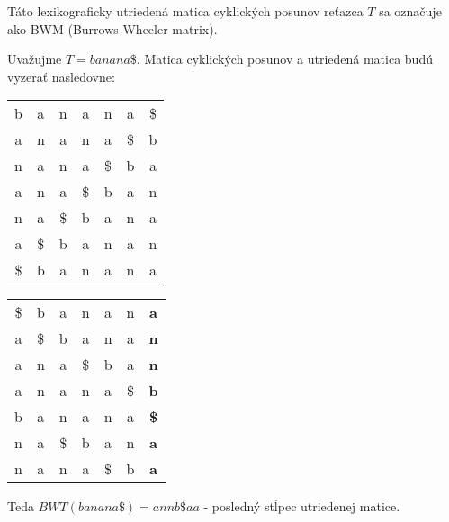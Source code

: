     Táto lexikograficky utriedená matica cyklických posunov reťazca $T$
    sa označuje ako BWM (Burrows-Wheeler matrix).
    
    \begin{example}
        \label{ex:bwt_banana}
        Uvažujme $T = banana\$$. Matica cyklických posunov a utriedená matica 
        budú vyzerať nasledovne:
        
        \bigskip
        
        \begin{minipage}{2.5in}
            \begin{tabular}{ c c c c c c c }
                b  & a  & n  & a  & n  & a  & \$ \\
                a  & n  & a  & n  & a  & \$ & b  \\
                n  & a  & n  & a  & \$ & b  & a  \\
                a  & n  & a  & \$ & b  & a  & n  \\
                n  & a  & \$ & b  & a  & n  & a  \\
                a  & \$ & b  & a  & n  & a  & n  \\
                \$ & b  & a  & n  & a  & n  & a  \\
            \end{tabular}
        \end{minipage}
        \begin{minipage}{2.5in}
            \begin{tabular}{ c c c c c c c }
                \$ & b  & a  & n  & a  & n  & \textbf{a}  \\            
                a  & \$ & b  & a  & n  & a  & \textbf{n}  \\
                a  & n  & a  & \$ & b  & a  & \textbf{n}  \\
                a  & n  & a  & n  & a  & \$ & \textbf{b}  \\
                b  & a  & n  & a  & n  & a  & \textbf{\$} \\
                n  & a  & \$ & b  & a  & n  & \textbf{a}  \\ 
                n  & a  & n  & a  & \$ & b  & \textbf{a}  \\
            \end{tabular}
        \end{minipage}
        
        \bigskip
        
        Teda $BWT(banana\$) = annb\$aa$ - posledný stĺpec utriedenej matice.
    \end{example}


